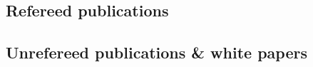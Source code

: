 \documentclass[letterpaper,12pt,preprint]{article}
\begin{document}
\subsection*{Refereed publications}

\begin{list}{}{\cvlist}

\end{list}

\subsection*{Unrefereed publications \& white papers}

\begin{list}{}{\cvlist}

\end{list}
\end{document}
